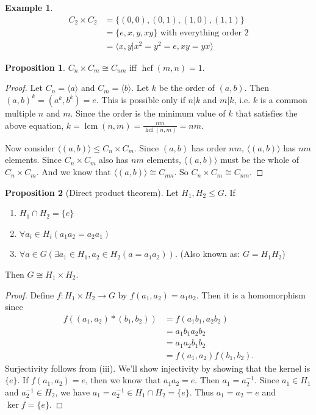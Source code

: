 \documentclass[a4paper]{article}
\theoremstyle{definition}
\newtheorem*{prop}{Proposition}
\newtheorem*{eg}{Example}
\newcommand{\bra}{\langle}
\newcommand{\ket}{\rangle}
\DeclareMathOperator\lcm{lcm}
\DeclareMathOperator\hcf{hcf}
\begin{document}
\begin{eg}
  \begin{align*}
    C_2\times C_2 &= \{(0, 0), (0, 1), (1, 0), (1, 1)\}\\
    &= \{e, x, y, xy\} \text{ with everything order 2}\\
    &= \bra x, y|x^2=y^2=e, xy = yx\ket
  \end{align*}
\end{eg}

\begin{prop}
  $C_n\times C_m\cong C_{nm}$ iff $\hcf(m, n) = 1$.
\end{prop}

\begin{proof}
  Let $C_n = \bra a\ket$ and $C_m = \bra b \ket$. Let $k$ be the order of $(a, b)$. Then $(a, b)^k = (a^k, b^k) = e$. This is possible only if $n | k$ and $m | k$, i.e. $k$ is a common multiple $n$ and $m$. Since the order is the minimum value of $k$ that satisfies the above equation, $k = \lcm(n, m) = \frac{nm}{\hcf(n, m)} = nm$.

  Now consider $\bra (a, b)\ket \leq C_n\times C_m$. Since $(a, b)$ has order $nm$, $\bra (a, b)\ket$ has $nm$ elements. Since $C_n\times C_m$ also has $nm$ elements, $\bra (a, b)\ket$ must be the whole of $C_n\times C_m$. And we know that $\bra (a, b)\ket\cong C_{nm}$. So $C_n\times C_m \cong C_{nm}$.
\end{proof}

\begin{prop}[Direct product theorem]
  Let $H_1, H_2\leq G$. If
  \begin{enumerate}
   \item $H_1\cap H_2 = \{e\}$
   \item $\forall a_i\in H_i(a_1a_2=a_2a_1)$
   \item $\forall a\in G(\exists a_1\in H_1, a_2\in H_2(a = a_1a_2))$. (Also known as: $G=H_1H_2$)
  \end{enumerate}
  Then $G\cong H_1\times H_2$.
\end{prop}

\begin{proof}
  Define $f:H_1\times H_2\rightarrow G$ by $f(a_1, a_2) = a_1a_2$. Then it is a homomorphism since
  \begin{align*}
    f((a_1, a_2)*(b_1,b_2)) &= f(a_1b_1, a_2b_2)\\
    &= a_1b_1a_2b_2\\
    &= a_1a_2b_1b_2\\
    &= f(a_1, a_2)f(b_1,b_2).
  \end{align*}
Surjectivity follows from (iii). We'll show injectivity by showing that the kernel is $\{e\}$. If $f(a_1, a_2)=e$, then we know that $a_1a_2 = e$. Then $a_1=a_2^{-1}$. Since $a_1 \in H_1$ and $a_2^{-1} \in H_2$, we have $a_1 = a_2^{-1} \in H_1\cap H_2 = \{e\}$. Thus $a_1 = a_2 = e$ and $\ker f = \{e\}$.
\end{proof}
\end{document}
